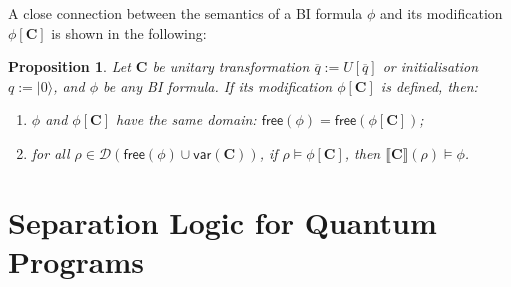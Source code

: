 \documentclass[conference,compsoc, 10pt]{IEEEtran}
\newcommand{\jh}[1]{\textit{\color{red}[JH] : #1}}
\newcommand{\lz}[1]{\textit{\color{blue}[LZ] : #1}}
\newtheorem{proposition}{Proposition}[section]
\newcommand {\qbar} {{\overline{q}}}
\newcommand {\qI} {{q:=|0\rangle}}
\newcommand {\qU} {{\overline{q}:=U[\overline{q}]}}
\newcommand {\cD } {{\mathcal{D}}}
\newcommand {\id } {{I}}
\newcommand {\free }[1] {{\mathsf{free}\left(#1\right)}}
\newcommand {\var } {\mathsf{var}}
\newcommand {\prog } {{\mathbf{C}}}
\newcommand {\sepimp} {\mathrel{-\mkern-6mu*}}
\newcommand {\sem}[1] {\llbracket#1\rrbracket}
\newcommand {\sdimp} {\mathrel{-\mkern-2.5mu\diamond}}
\def\>{\ensuremath{\rangle}}
\begin{document}
	
	
	A close connection between the semantics of a BI formula $\phi$ and its modification $\phi[\prog]$ is shown in the   following:  
	
	\begin{proposition}
		\label{pro modification}
		Let $\prog$ be unitary transformation $\qU$ or initialisation $\qI$, and $\phi$ be any BI formula. If its modification  $\phi[\prog]$ is defined, then:
		\begin{enumerate}
			\item $\phi$ and $\phi[\prog]$ have the same domain: $\free{\phi} = \free{\phi[\prog]}$;
			\item for all $\rho\in\cD(\free{\phi}\cup\var(\prog))$, if $\rho\models \phi[\prog]$, then $\sem{\prog}(\rho)\models \phi$.
		\end{enumerate}
	\end{proposition}
	
  
	
	\section{Separation Logic for Quantum Programs}
	\label{sec QSL}
	
\end{document}
